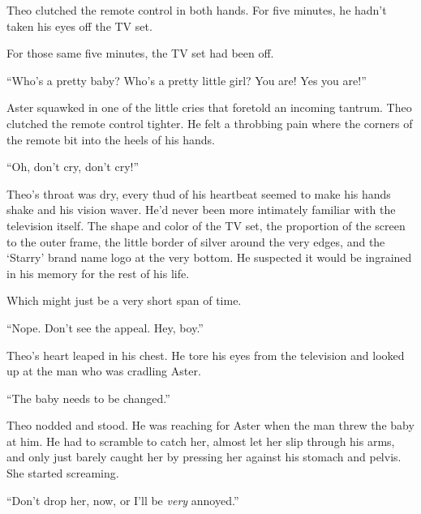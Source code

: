 





Theo clutched the remote control in both hands.  For five minutes, he hadn't taken his eyes off the TV set.



For those same five minutes, the TV set had been off.



``Who's a pretty baby?  Who's a pretty little girl?  You are! Yes you are!''



Aster squawked in one of the little cries that foretold an incoming tantrum.  Theo clutched the remote control tighter.  He felt a throbbing pain where the corners of the remote bit into the heels of his hands.



``Oh, don't cry, don't cry!''



Theo's throat was dry, every thud of his heartbeat seemed to make his hands shake and his vision waver.  He'd never been more intimately familiar with the television itself.  The shape and color of the TV set, the proportion of the screen to the outer frame, the little border of silver around the very edges, and the `Starry' brand name logo at the very bottom.  He suspected it would be ingrained in his memory for the rest of his life.



Which might just be a very short span of time.



``Nope.  Don't see the appeal.  Hey, boy.''



Theo's heart leaped in his chest.  He tore his eyes from the television and looked up at the man who was cradling Aster.



``The baby needs to be changed.''



Theo nodded and stood.  He was reaching for Aster when the man threw the baby at him.  He had to scramble to catch her, almost let her slip through his arms, and only just barely caught her by pressing her against his stomach and pelvis.  She started screaming.



``Don't drop her, now, or I'll be \emph{very} annoyed.''



